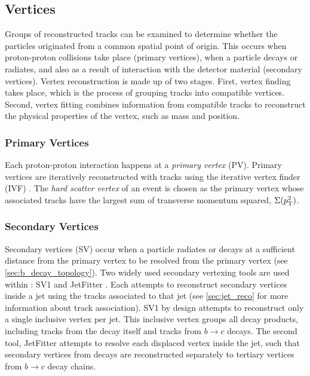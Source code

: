 \subsection{Vertices}\label{sec:vertex_reco}
Groups of reconstructed tracks can be examined to determine whether the particles originated from a common spatial point of origin.
This occurs when proton-proton collisions take place (primary vertices), when a particle decays or radiates, and also as a result of interaction with the detector material (secondary vertices).
Vertex reconstruction is made up of two stages.
First, vertex finding takes place, which is the process of grouping tracks into compatible vertices.
Second, vertex fitting combines information from compatible tracks to reconstruct the physical properties of the vertex, such as mass and position.

\subsubsection{Primary Vertices}
Each proton-proton interaction happens at a \textit{primary vertex} (PV).
Primary vertices are iteratively reconstructed with tracks using the iterative vertex finder (IVF) \cite{PERF-2015-01}.
The \textit{hard scatter vertex} of an event is chosen as the primary vertex whose associated tracks have the largest sum of transverse momentum squared, $\Sigma(p_{\text{T}}^2)$.

\subsubsection{Secondary Vertices}
Secondary vertices (SV) occur when a particle radiates or decays at a sufficient distance from the primary vertex to be resolved from the primary vertex (see \cref{sec:b_decay_topology}).
Two widely used secondary vertexing tools are used within \ATLAS: SV1 and JetFitter \cite{FTAG-2018-01,ATL-PHYS-PUB-2017-011}.
Each attempts to reconstruct secondary vertices inside a jet using the tracks associated to that jet (see \cref{sec:jet_reco} for more information about track association).
SV1 by design attempts to reconstruct only a single inclusive vertex per jet.
This inclusive vertex groups all \bhadron decay products, including tracks from the \bhadron decay itself and tracks from $b \rightarrow c$ decays.
The second tool, JetFitter attempts to resolve each displaced vertex inside the jet, such that secondary vertices from \bhadron decays are reconstructed separately to tertiary vertices from $b \rightarrow c$ decay chains.



